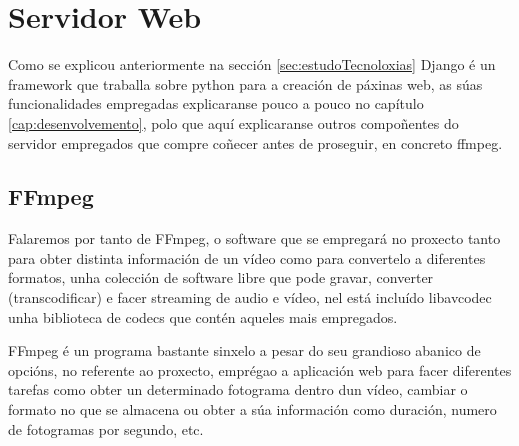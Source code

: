 \section{Servidor Web}
    Como se explicou anteriormente na sección \ref{sec:estudoTecnoloxias} Django é un framework
    que traballa sobre python para a creación de páxinas web, as súas funcionalidades empregadas
    explicaranse pouco a pouco no capítulo \ref{cap:desenvolvemento}, polo que aquí explicaranse
    outros compoñentes do servidor empregados que compre coñecer antes de proseguir, en concreto 
    ffmpeg.
    
\subsection{FFmpeg}
    Falaremos por tanto de FFmpeg, o software que se empregará no proxecto tanto para obter 
    distinta información de un vídeo como para convertelo a diferentes formatos, unha colección de 
    software libre que pode gravar, converter (transcodificar) e facer streaming de audio e vídeo,
    nel está incluído libavcodec unha biblioteca de codecs que contén aqueles mais empregados.
    
    FFmpeg é un programa bastante sinxelo a pesar do seu grandioso abanico de opcións, no referente
    ao proxecto, emprégao a aplicación web para facer diferentes tarefas como obter un determinado
    fotograma dentro dun vídeo, cambiar o formato no que se almacena ou obter a súa información como
    duración, numero de fotogramas por segundo, etc.
    